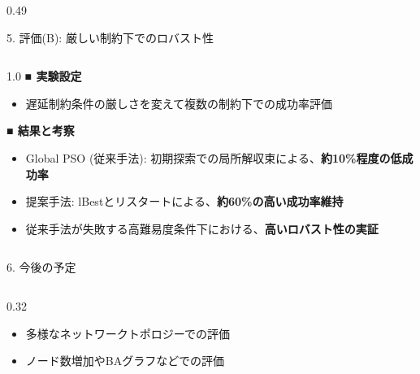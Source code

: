 \documentclass[final,t]{beamer}
\begin{document}
\begin{frame}[fragile]
\begin{columns}[t, onlytextwidth]
\begin{column}{0.49\textwidth}
\begin{block}{5. 評価(B): 厳しい制約下でのロバスト\hspace{-0.2em}性}
            \vspace{0.5cm}
            
            \begin{columns}[T, totalwidth=\linewidth]
                \begin{column}{1.0\linewidth}
                    \normalsize
                    \textbf{■ 実験設定}
                    \begin{itemize}
                        \item 遅延制約条件の厳しさを変えて複数の制約下での成功率評価
                    \end{itemize}
                    \vspace{0.3em}
                    \textbf{■ 結果と考察}
                    \begin{itemize}
                        \item {Global PSO (従来手法)}: 初期探索での局所解収束による、\textbf{約10\%程度の低成功率}
                        \item {提案手法}: lBestとリスタート\hspace{-0.2em}による、\textbf{約60\%の高い成功率維持}
                        \item 従来手法が失敗する高難易度条件下における、\textbf{高いロバスト\hspace{-0.2em}性の実証}
                    \end{itemize}
                \end{column}
            \end{columns}
        \end{block}

    \end{column}
\end{columns}

\vspace{0.5cm}

\begin{block}{6. 今後の予定}
    \begin{columns}[T, onlytextwidth]
        \begin{column}{0.32\linewidth}
            \begin{itemize}
                \item 多様なネット\hspace{-0.2em}ワークト\hspace{-0.2em}ポロジーでの評価
                \item ノード数増加やBAグラフなどでの評価
            \end{itemize}
        \end{column}
        

\end{columns}
\end{block}
\end{frame}
\end{document}
